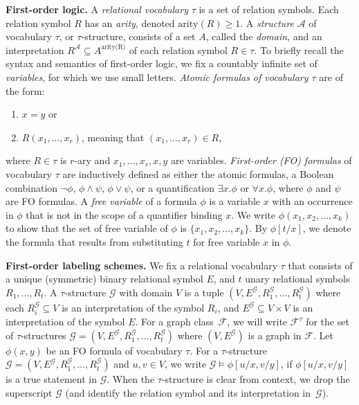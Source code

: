 \documentclass{theoretics}
\newcommand{\cF}{\ensuremath{\mathcal{F}}}
\newcommand{\cG}{\ensuremath{\mathcal{G}}}
\begin{document}
\medskip
\noindent
\textbf{First-order logic.}
A \textit{relational vocabulary} $\tau$ is a set of relation symbols. Each relation symbol $R$ 
has an \textit{arity}, denoted $\text{arity}(R) \geq 1$. A \textit{structure} $\mathcal{A}$ 
of vocabulary $\tau$, or $\tau$-structure,  consists of a set $A$, called the \textit{domain}, and an interpretation
$R^{\mathcal{A}} \subseteq A^{\text{arity(R)}}$ of each relation symbol $R \in \tau$.
To briefly recall the syntax and semantics of first-order logic, we fix a countably
infinite set of \textit{variables}, for which we use small letters. 
\textit{Atomic formulas of vocabulary $\tau$} are of the form:
\begin{enumerate} 
	\item $x = y$ or
	\item $R(x_1, \ldots, x_r)$, meaning that $(x_1, \ldots, x_r) \in R$,
\end{enumerate}
where $R \in \tau$ is $r$-ary and $x_1, \ldots , x_r, x, y$ are variables.
\textit{First-order (FO) formulas} of vocabulary $\tau$ are inductively defined as either the atomic formulas,
a Boolean combination $\neg\phi$, $\phi\wedge\psi$, $\phi\vee\psi$, or a quantification $\exists
x.\phi$ or $\forall x.\phi$, where $\phi$ and $\psi$ are FO formulas.
%
A \textit{free variable} of a formula $\phi$ is a variable $x$ with an occurrence in $\phi$ 
that is not in the scope of a quantifier binding $x$. 
We write $\phi(x_1, x_2, \ldots, x_k)$ to show that the set of free variable of $\phi$
is $\{ x_1, x_2, \ldots, x_k \}$.
By $\phi[t/x]$, we denote the formula that results from substituting $t$ for free variable $x$ in $\phi$.


\medskip
\noindent
\textbf{First-order labeling schemes.}
We fix a relational vocabulary $\tau$ that consists of a unique (symmetric) binary relational symbol
$E$, and $t$ unary relational symbols $R_1, \dotsc, R_t$. A $\tau$-structure $\cG$ with
domain $V$ is a tuple $(V, E^\cG, R_1^\cG, \dotsc, R_t^\cG)$ where each $R_i^\cG \subseteq V$ is an
interpretation of the symbol $R_i$, and $E^\cG \subseteq V \times V$ is an interpretation of the symbol
$E$. 
For a graph class~$\cF$, we will write $\cF^\tau$ for the set of $\tau$-structures $\cG = (V, E^\cG,
R_1^\cG, \dotsc, R_t^\cG)$ where $(V,E^\cG)$ is a graph in $\cF$. Let $\phi(x,y)$ be an FO formula of
vocabulary $\tau$. For a $\tau$-structure $\cG = (V,E^\cG,R_1^\cG,\dotsc,R_t^\cG)$ and $u,v \in V$, we write $\cG \models \phi[u/x,v/y]$, if $\phi[u/x,v/y]$ is a true statement in $\cG$.
When the $\tau$-structure is clear from context, we drop the superscript $\cG$ (and identify the relation symbol and its interpretation in~$\cG$).
\end{document}
